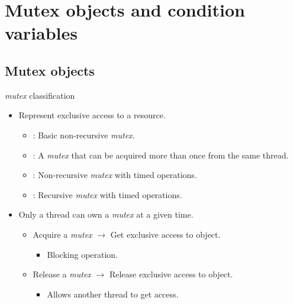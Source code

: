 \section{Mutex objects and condition variables}

\subsection{Mutex objects}

\begin{frame}[t]{\emph{mutex} classification}
\begin{itemize}
  \item Represent exclusive access to a resource.
    \begin{itemize}
      \item {}: Basic non-recursive \emph{mutex}.
      \item {}: A \emph{mutex} that can be acquired more than once from the same thread.
      \item {}: Non-recursive \emph{mutex} with timed operations.
      \item {}: Recursive \emph{mutex} with timed operations.
    \end{itemize}
  \item Only a thread can own a \emph{mutex} at a given time.
    \begin{itemize}
      \item Acquire a \emph{mutex} $\rightarrow$ Get exclusive access to object.
        \begin{itemize}
          \item Blocking operation.
        \end{itemize}
      \item Release a \emph{mutex} $\rightarrow$ Release exclusive access to object.
        \begin{itemize}
          \item Allows another thread to get access.
        \end{itemize}
    \end{itemize}
\end{itemize}
\end{frame}

